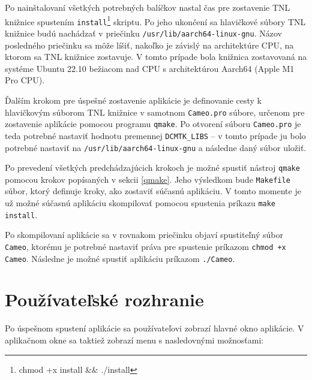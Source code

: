 {Po nainštalovaní všetkých potrebných balíčkov nastal čas pre zostavenie TNL knižnice spustením \texttt{install}\footnote{chmod +x install \&\& ./install} skriptu. Po jeho ukončení sa hlavičkové súbory TNL knižnice budú nachádzať v priečinku \texttt{/usr/lib/aarch64-linux-gnu}. Názov posledného priečinku sa môže líšiť, nakoľko je závislý na architektúre CPU, na ktorom sa TNL knižnice zostavuje. V tomto prípade bola knižnica zostavovaná na systéme Ubuntu 22.10 bežiacom nad CPU s architektúrou Aarch64 (Apple M1 Pro CPU).

Ďalším krokom pre úspešné zostavenie aplikácie je definovanie cesty k hlavičkovým súborom TNL knižnice v samotnom \texttt{Cameo.pro} súbore, určenom pre zostavenie aplikácie pomocou programu \texttt{qmake}. Po otvorení súboru \texttt{Cameo.pro} je teda potrebné nastaviť hodnotu premennej \lstinline{DCMTK_LIBS} -- v tomto prípade ju bolo potrebné nastaviť na \texttt{/usr/lib/aarch64-linux-gnu} a následne daný súbor uložiť.

Po prevedení všetkých predchádzajúcich krokoch je možné spustiť nástroj \texttt{qmake} pomocou krokov popísaných v sekcii \ref{qmake}. Jeho výsledkom bude \newline \texttt{Makefile} súbor, ktorý definuje kroky, ako zostaviť súčasnú aplikáciu. V tomto momente je už možné súčasnú aplikáciu skompilovať pomocou spustenia príkazu \texttt{make install}.

Po skompilovaní aplikácie sa v rovnakom priečinku objaví spustiteľný súbor \texttt{Cameo}, ktorému je potrebné nastaviť práva pre spustenie príkazom \texttt{chmod +x Cameo}. Následne je možné spustiť aplikáciu príkazom \texttt{./Cameo}. \clearpage

\section {Používateľské rozhranie}\label{old_ui}
Po úspešnom spustení aplikácie sa používateľovi zobrazí hlavné okno aplikácie.
V aplikačnom okne sa taktiež zobrazí menu s nasledovnými možnosťami:

}
